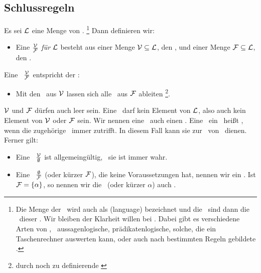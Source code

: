 \subsection{Schlussregeln}%
\label{sub:Schlussregeln}

Es sei $\mathcal{L}$ eine Menge von \Formeln.%
	\footnote{%
	Die Menge der \Formeln\ wird auch als  (language) bezeichnet und die \Formeln\ sind dann die \Worte\ dieser \Sprache.
	Wir bleiben der Klarheit willen bei \Formel.
	Dabei gibt es verschiedene Arten von \Formeln, \textzB\ aussagenlogische, prädikatenlogische, solche, die ein Taschenrechner auswerten kann, oder auch nach bestimmten Regeln gebildete \Zeichenketten.
}
Dann definieren wir:
\begin{itemize}
	\item[] Eine  $\frac{\mathcal{V}}{\mathcal{F}}$ \emph{für} $\mathcal{L}$ besteht aus einer Menge $\mathcal{V}\subseteq\mathcal{L}$, den , und einer Menge $\mathcal{F}\subseteq\mathcal{L}$, den .
\end{itemize}
Eine \Schlussregel\ $\frac{\mathcal{V}}{\mathcal{F}}$ entspricht der \Aussage:
%
\begin{itemize}
	\item[] Mit den \Voraussetzungen\ aus $\mathcal{V}$ lassen sich alle \Folgerungen\ aus $\mathcal{F}$ ableiten%
	\footnote{durch noch zu definierende \emph{\zulaessigeTransformationen}}.
\end{itemize}
%
$\mathcal{V}$ und $\mathcal{F}$ dürfen auch leer sein.
Eine \Schlussregel\ darf kein Element von $\mathcal{L}$, also auch kein Element von $\mathcal{V}$ oder $\mathcal{F}$ sein.
Wir nennen eine \Schlussregel\ auch einen .
Eine  \textbzw\ ein \formalerSatz\ heißt , wenn die zugehörige \Aussage\ immer zutrifft.
In diesem Fall kann sie zur \zulaessigenTransformation\ von \Formeln\ dienen.
Ferner gilt:
%
\begin{itemize}
	\item Eine \Schlussregel\ $\frac{\mathcal{V}}{\emptyset}$ ist allgemeingültig, \textdh\ sie ist immer wahr.
	\item Eine \Schlussregel\ $\frac{\emptyset}{\mathcal{F}}$ (oder kürzer $\mathcal{F}$), die keine Voraussetzungen hat, nennen wir ein .
	Ist $\mathcal{F} = \{\alpha\}$, so nennen wir die \Schlussregel\ (oder kürzer $\alpha$) auch .
\end{itemize}

